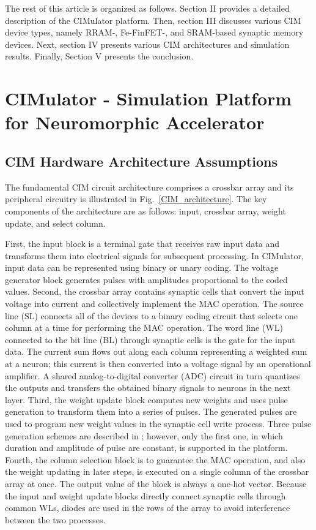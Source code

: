\documentclass[journal]{IEEEtran}
\begin{document}
The rest of this article is organized as follows. Section II provides a detailed description of the CIMulator platform. Then, section III discusses various
CIM device types, namely RRAM-, Fe-FinFET-, and SRAM-based synaptic memory devices. Next, section IV presents various CIM architectures and simulation
results. Finally, Section V presents the conclusion.

\section{CIMulator - Simulation Platform for Neuromorphic Accelerator}

\subsection{CIM Hardware Architecture Assumptions}
The fundamental CIM circuit architecture comprises a crossbar array and its peripheral circuitry is illustrated in Fig.~\ref{CIM_architecture}. The key components of the architecture are as follows: input, crossbar array, weight update, and select column.


First, the input block is a terminal gate that receives raw input data and transforms them into electrical signals for subsequent processing. In CIMulator, input data can be represented using binary or unary coding. The voltage generator block generates pulses with amplitudes proportional to the coded values. 
Second, the crossbar array contains synaptic cells that convert
the input voltage into current and collectively implement the MAC operation. The source line (SL) connects all of the devices to a binary coding circuit that selects one column at a time for performing the MAC operation. The word line (WL) connected to the bit line (BL) through synaptic cells is the gate for the input data. The current sum flows out along each column representing a
weighted sum at a neuron; this current is then converted into a voltage signal by an operational amplifier. A shared analog-to-digital converter (ADC) circuit in turn quantizes the outputs and transfers the obtained binary signals
to neurons in the next layer. Third, the weight update block computes
new weights and uses pulse generation to transform them into a series of
pulses. The generated pulses are used to program new weight values in the
synaptic cell write process. Three pulse generation schemes are described
in \cite{FeRAM}; however, only the first one, in which duration and amplitude of pulse are constant, is supported in the platform. Fourth, the column selection block is to guarantee the MAC operation, and also the weight updating in later steps, is executed on a single column of the crossbar array at once. The output value of the block is always a one-hot vector. Because the input and weight update blocks directly connect synaptic cells through common WLs, diodes are used in the rows of the array to avoid interference between the two processes. 
\end{document}
